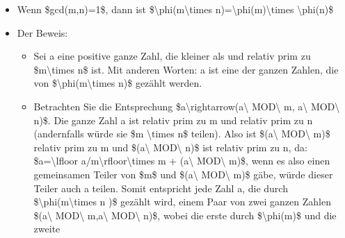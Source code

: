 \documentclass[a4paper]{article}
\begin{document}
\begin{multicols}{3}
\begin{itemize}
              \begin{itemize}
                  \item
                        Wenn \$gcd(m,n)=1\$, dann ist
                        \$\textbackslash phi(m\textbackslash times
                        n)=\textbackslash phi(m)\textbackslash times \textbackslash phi(n)\$
                  \item
                        Der Beweis:

                        \begin{itemize}
                            \item
                                  Sei a eine positive ganze Zahl, die kleiner als und relativ prim
                                  zu \$m\textbackslash times n\$ ist. Mit anderen Worten: a ist eine
                                  der ganzen Zahlen, die von
                                  \$\textbackslash phi(m\textbackslash times n)\$ gezählt werden.
                            \item
                                  Betrachten Sie die Entsprechung
                                  \$a\textbackslash rightarrow(a\textbackslash{} MOD\textbackslash{}
                                  m, a\textbackslash{} MOD\textbackslash{} n)\$. Die ganze Zahl a
                                  ist relativ prim zu m und relativ prim zu n (andernfalls würde sie
                                  \$m \textbackslash times n\$ teilen). Also ist
                                  \$(a\textbackslash{} MOD\textbackslash{} m)\$ relativ prim zu m
                                  und \$(a\textbackslash{} MOD\textbackslash{} n)\$ ist relativ prim
                                  zu n, da: \$a=\textbackslash lfloor
                                  a/m\textbackslash rfloor\textbackslash times m +
                                  (a\textbackslash{} MOD\textbackslash{} m)\$, wenn es also einen
                                  gemeinsamen Teiler von \$m\$ und \$(a\textbackslash{}
                                  MOD\textbackslash{} m)\$ gäbe, würde dieser Teiler auch a teilen.
                                  Somit entspricht jede Zahl a, die durch
                                  \$\textbackslash phi(m\textbackslash times n )\$ gezählt wird,
                                  einem Paar von zwei ganzen Zahlen \$(a\textbackslash{}
                                  MOD\textbackslash{} m,a\textbackslash{} MOD\textbackslash{} n)\$,
                                  wobei die erste durch \$\textbackslash phi(m)\$ und die zweite

\end{itemize}
\end{itemize}
\end{itemize}
\end{multicols}
\end{document}
